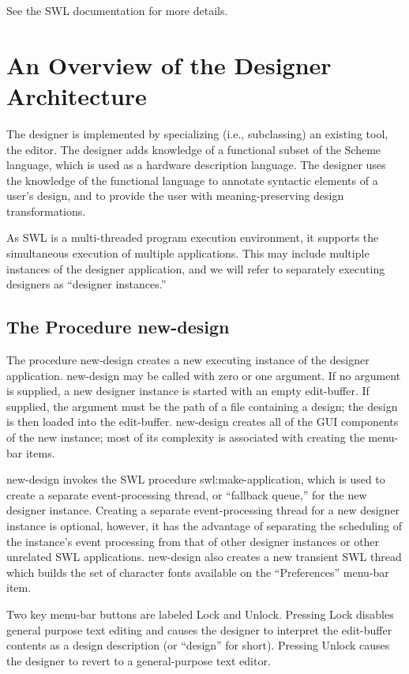 \documentclass{article}
\begin{document}
See the {\sc SWL} documentation\cite{SWL} for more details.




\section{An Overview of the Designer Architecture}


The designer is implemented by specializing (i.e., subclassing) an
existing tool, the editor.  The designer adds knowledge of a
functional subset of the Scheme language, which is used as a hardware
description language.  The designer uses the knowledge of the
functional language to annotate syntactic elements of a user's design,
and to provide the user with meaning-preserving
design transformations.

As {\sc SWL} is a multi-threaded program execution environment, it
supports the simultaneous execution of multiple applications.  This
may include multiple instances of the designer application, and we
will refer to separately executing designers as ``designer
instances.''

\subsection{The Procedure {\sf new-design}}

The procedure {\sf new-design} creates a new executing instance of the
designer application.  {\sf new-design} may be called with zero or one
argument.  If no argument is supplied, a new designer instance is
started with an empty edit-buffer.  If supplied, the argument must be
the path of a file containing a design; the design is then loaded into
the edit-buffer.  {\sf new-design} creates all of the GUI components
of the new instance; most of its complexity is associated with
creating the menu-bar items.

{\sf new-design} invokes the {\sc SWL} procedure {\sf
swl:make-application}, which is used to create a separate
event-processing thread, or ``fallback queue,'' for the new designer
instance.  Creating a separate event-processing thread for a new
designer instance is optional, however, it has the advantage of
separating the scheduling of the instance's event processing from that
of other designer instances or other unrelated {\sc SWL} applications.
{\sf new-design} also creates a new transient {\sc SWL} thread which
builds the set of character fonts available on the ``Preferences''
menu-bar item.

Two key menu-bar buttons are labeled Lock and Unlock.  Pressing Lock
disables general purpose text editing and causes the designer to
interpret the edit-buffer contents as a design description (or
``design'' for short).  Pressing Unlock causes the designer to revert
to a general-purpose text editor.
\end{document}
